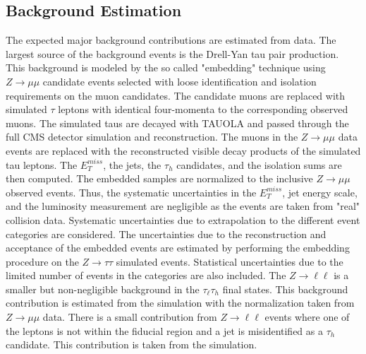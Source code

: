 \subsection{Background Estimation}

The expected major background contributions are estimated from data. The largest source of the background events is the Drell-Yan tau pair production. This background is modeled by the so called "embedding" technique using $Z \rightarrow \mu\mu$ candidate events selected with loose identification and isolation requirements on the muon candidates.  The candidate muons are replaced with simulated $\tau$ leptons with identical four-momenta to the corresponding observed muons.  The simulated taus are decayed with TAUOLA and passed through the full CMS detector simulation and reconstruction. The muons in the $Z \rightarrow \mu\mu$ data events are replaced with the reconstructed visible decay products of the simulated tau leptons. The $E_{T}^{miss}$, the jets, the $\tau_h$ candidates, and the isolation sums are then computed. The embedded samples are normalized to the inclusive $Z\rightarrow \mu\mu$ observed events.  Thus, the systematic uncertainties in the $E_{T}^{miss}$, jet energy scale, and the luminosity measurement are negligible as the events are taken from "real" collision data. Systematic uncertainties due to extrapolation to the different event categories are considered. The uncertainties due to the reconstruction and acceptance of the embedded events are estimated by performing the embedding procedure on the $Z\rightarrow\tau\tau$ simulated events. Statistical uncertainties due to the limited number of events in the categories are also included.  The $Z\rightarrow \ell\ell$ is a smaller but non-negligible background in the $\tau_{\ell}\tau_h$ final states. This background contribution is estimated from the simulation with the normalization taken from $Z\rightarrow\mu\mu$ data. There is a small contribution from $Z\rightarrow \ell\ell$ events where one of the leptons is not within the fiducial region and a jet is misidentified as a $\tau_h$ candidate. This contribution is taken from the simulation.  

